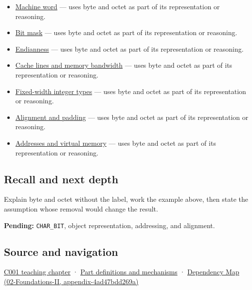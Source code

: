 \begin{itemize}
\tightlist
\item
  \hyperref[appendix-d67a19507dc5]{Machine word} --- uses byte and octet as part of its representation or reasoning.
\item
  \hyperref[appendix-dbe5905163c2]{Bit mask} --- uses byte and octet as part of its representation or reasoning.
\item
  \hyperref[appendix-bc07c3d25b18]{Endianness} --- uses byte and octet as part of its representation or reasoning.
\item
  \hyperref[appendix-e4ccdbab8320]{Cache lines and memory bandwidth} --- uses byte and octet as part of its representation or reasoning.
\item
  \hyperref[appendix-cc04044b5782]{Fixed-width integer types} --- uses byte and octet as part of its representation or reasoning.
\item
  \hyperref[appendix-a1f7c53b4742]{Alignment and padding} --- uses byte and octet as part of its representation or reasoning.
\item
  \hyperref[appendix-18ee4f913c3c]{Addresses and virtual memory} --- uses byte and octet as part of its representation or reasoning.
\end{itemize}

\subsection{Recall and next depth}\label{recall-and-next-depth}

Explain byte and octet without the label, work the example above, then state the assumption whose removal would change the result.

\textbf{Pending:} \texttt{CHAR\_BIT}, object representation, addressing, and alignment.

\subsection{Source and navigation}\label{source-and-navigation}

\href{Continuous\%20Notes/Computing\%20Foundations\%20-\%20From\%20Bits\%20to\%20C++\%20and\%20Systems\%20APIs\#From\%20a\%20signal\%20to\%20an\%20interpretation}{C001 teaching chapter} · \hyperref[appendix-fd090d982a15]{Part definitions and mechanisms} · \href{}{Dependency Map (02-Foundations-II, appendix-4ad47bdd269a)}
